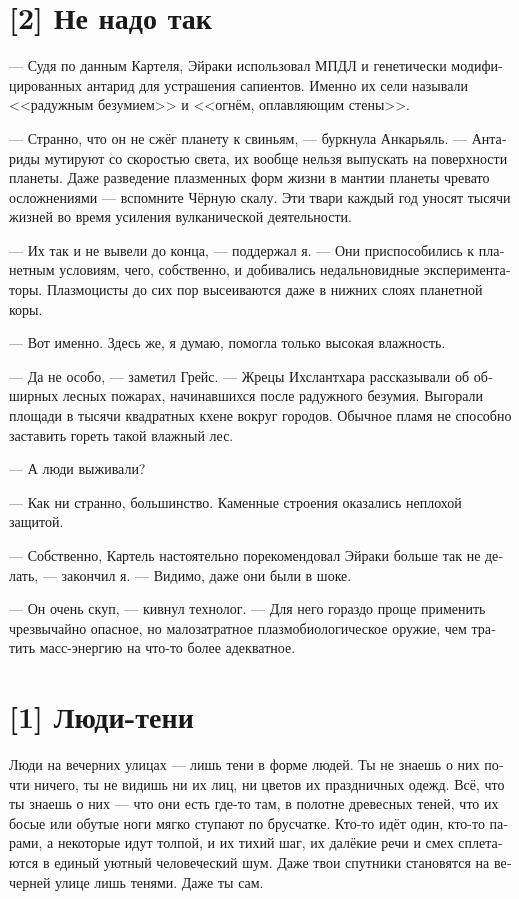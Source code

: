 \documentclass[a4paper,12pt,fleqn]{book}\usepackage{cooltooltips}\usepackage{polyglossia}\setdefaultlanguage[babelshorthands=true]{russian}\setotherlanguage{english}\defaultfontfeatures{Ligatures=TeX,Mapping=tex-text} \usepackage{xcolor}\definecolor{lightgray}{HTML}{bbbbbb}\color{lightgray}\newcommand{\ml}[3]{\textenglish{\textcolor{black}{#3}}}
\begin{document}
{\section{[2] Не надо так}

--- Судя по данным Картеля, Эйраки использовал МПДЛ и генетически модифицированных антарид для устрашения сапиентов.
Именно их сели называли <<радужным безумием>> и <<огнём, оплавляющим стены>>.

--- Странно, что он не сжёг планету к свиньям, --- буркнула Анкарьяль.
--- Антариды мутируют со скоростью света, их вообще нельзя выпускать на поверхности планеты.
Даже разведение плазменных форм жизни в мантии планеты чревато осложнениями --- вспомните Чёрную скалу.
Эти твари каждый год уносят тысячи жизней во время усиления вулканической деятельности.

--- Их так и не вывели до конца, --- поддержал я.
--- Они приспособились к планетным условиям, чего, собственно, и добивались недальновидные экспериментаторы.
Плазмоцисты до сих пор высеиваются даже в нижних слоях планетной коры.

--- Вот именно.
Здесь же, я думаю, помогла только высокая влажность.

--- Да не особо, --- заметил Грейс.
--- Жрецы Ихслантхара рассказывали об обширных лесных пожарах, начинавшихся после радужного безумия.
Выгорали площади в тысячи квадратных кхене вокруг городов.
Обычное пламя не способно заставить гореть такой влажный лес.

--- А люди выживали?

--- Как ни странно, большинство.
Каменные строения оказались неплохой защитой.

--- Собственно, Картель настоятельно порекомендовал Эйраки больше так не делать, --- закончил я.
--- Видимо, даже они были в шоке.

--- Он очень скуп, --- кивнул технолог.
--- Для него гораздо проще применить чрезвычайно опасное, но малозатратное плазмобиологическое оружие, чем тратить масс-энергию на что-то более адекватное.

\section{[1] Люди-тени}

Люди на вечерних улицах --- лишь тени в форме людей.
Ты не знаешь о них почти ничего, ты не видишь ни их лиц, ни цветов их праздничных одежд.
Всё, что ты знаешь о них --- что они есть где-то там, в полотне древесных теней, что их босые или обутые ноги мягко ступают по брусчатке.
Кто-то идёт один, кто-то парами, а некоторые идут толпой, и их тихий шаг, их далёкие речи и смех сплетаются в единый уютный человеческий шум.
Даже твои спутники становятся на вечерней улице лишь тенями.
Даже ты сам.

}
\end{document}
